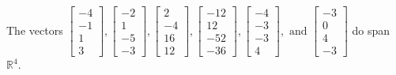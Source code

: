 \begin{exercise}
\begin{exerciseStatement}
  \end{exerciseStatement}
  \begin{exerciseAnswer}
   The vectors \(\left[\begin{array}{r}
-4 \\
-1 \\
1 \\
3
\end{array}\right] , \left[\begin{array}{r}
-2 \\
1 \\
-5 \\
-3
\end{array}\right] , \left[\begin{array}{r}
2 \\
-4 \\
16 \\
12
\end{array}\right] , \left[\begin{array}{r}
-12 \\
12 \\
-52 \\
-36
\end{array}\right] , \left[\begin{array}{r}
-4 \\
-3 \\
-3 \\
4
\end{array}\right] , \text{ and } \left[\begin{array}{r}
-3 \\
0 \\
4 \\
-3
\end{array}\right]\) 
  	 do  
	span \(\mathbb{R}^4\).
  


  \end{exerciseAnswer}
\end{exercise}